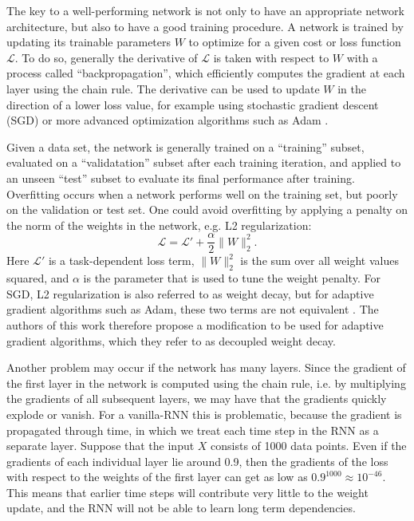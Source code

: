 The key to a well-performing network is not only to have an appropriate network architecture, but also to have a good training procedure. A network is trained by updating its trainable parameters $W$ to optimize for a given cost or loss function $\mathcal{L}$. To do so, generally the derivative of $\mathcal{L}$ is taken with respect to $W$ with a process called ``backpropagation'', which efficiently computes the gradient at each layer using the chain rule. The derivative can be used to update $W$ in the direction of a lower loss value, for example using stochastic gradient descent (SGD) or more advanced optimization algorithms such as Adam \citep{kingma2014adam}.

Given a data set, the network is generally trained on a ``training'' subset, evaluated on a ``validatation'' subset after each training iteration, and applied to an unseen ``test'' subset to evaluate its final performance after training. Overfitting occurs when a network performs well on the training set, but poorly on the validation or test set. One could avoid overfitting by applying a penalty on the norm of the weights in the network, e.g. L2 regularization:
\begin{equation}
    \mathcal{L} = \mathcal{L'} + \frac{\alpha}{2} \|W\|_2^2.
\end{equation}
Here $\mathcal{L'}$ is a task-dependent loss term, $\|W\|_2^2$ is the sum over all weight values squared, and $\alpha$ is the parameter that is used to tune the weight penalty. For SGD, L2 regularization is also referred to as weight decay, but for adaptive gradient algorithms such as Adam, these two terms are not equivalent \citep{loshchilov2017decoupled}. The authors of this work therefore propose a modification to be used for adaptive gradient algorithms, which they refer to as decoupled weight decay.

Another problem may occur if the network has many layers. Since the gradient of the first layer in the network is computed using the chain rule, i.e. by multiplying the gradients of all subsequent layers, we may have that the gradients quickly explode or vanish. For a vanilla-RNN this is problematic, because the gradient is propagated through time, in which we treat each time step in the RNN as a separate layer. Suppose that the input $X$ consists of 1000 data points. Even if the gradients of each individual layer lie around 0.9, then the gradients of the loss with respect to the weights of the first layer can get as low as $0.9^{1000}\approx10^{-46}$. This means that earlier time steps will contribute very little to the weight update, and the RNN will not be able to learn long term dependencies.

